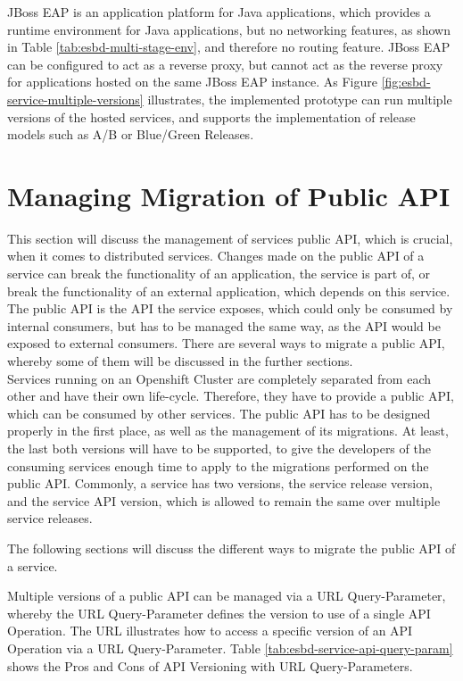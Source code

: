 JBoss EAP is an application platform for Java applications, which provides a runtime environment for Java applications, but no networking features, as shown in Table \vref{tab:esbd-multi-stage-env}, and therefore no routing feature. JBoss EAP can be configured to act as a reverse proxy, but cannot act as the reverse proxy for applications hosted on the same JBoss EAP instance. As Figure \vref{fig:esbd-service-multiple-versions} illustrates, the implemented prototype can run multiple versions of the hosted services, and supports the implementation of release models such as A/B or Blue/Green Releases.

\section{Managing Migration of Public API}
\label{sec:esbd-multi-stage-env}
This section will discuss the management of services public API, which is crucial, when it comes to distributed services. Changes made on the public API of a service can break the functionality of an application, the service is part of, or break the functionality of an external application, which depends on this service. The public API is the API the service exposes, which could only be consumed by internal consumers, but has to be managed the same way, as the API would be exposed to external consumers. There are several ways to migrate a public API, whereby some of them will be discussed in the further sections. \\  

Services running on an Openshift Cluster are completely separated from each other and have their own life-cycle. Therefore, they have to provide a public API, which can be consumed by other services. The public API has to be designed properly in the first place, as well as the management of its migrations. At least, the last both versions will have to be supported, to give the developers of the consuming services enough time to apply to the migrations performed on the public API. Commonly, a service has two versions, the service release version, and the service API version, which is allowed to remain the same over multiple service releases. 
\newpage

The following sections will discuss the different ways to migrate the public API of a service.

Multiple versions of a public API can be managed via a URL Query-Parameter, whereby the URL Query-Parameter defines the version to use of a single API Operation. The URL  illustrates how to access a specific version of an API Operation via a URL Query-Parameter. Table \vref{tab:esbd-service-api-query-param} shows the Pros and Cons of API Versioning with URL Query-Parameters.

